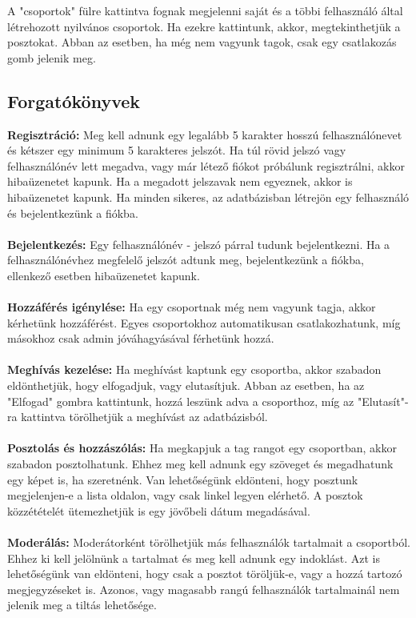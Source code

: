 \documentclass[
]{thesis-ekf}
\theoremstyle{definition}
\theoremstyle{remark}
\begin{document}
A "csoportok" fülre kattintva fognak megjelenni saját és a többi felhasználó által létrehozott nyilvános csoportok. Ha ezekre kattintunk, akkor, megtekinthetjük a posztokat. Abban az esetben, ha még nem vagyunk tagok, csak egy csatlakozás gomb jelenik meg.

\newpage 
\subsection{Forgatókönyvek}
\vspace{5mm}
\textbf{Regisztráció:} Meg kell adnunk egy legalább 5 karakter hosszú felhasználónevet és kétszer egy minimum 5 karakteres jelszót. Ha túl rövid jelszó vagy felhasználónév lett megadva, vagy már létező fiókot próbálunk regisztrálni, akkor hibaüzenetet kapunk. Ha a megadott jelszavak nem egyeznek, akkor is hibaüzenetet kapunk. Ha minden sikeres, az adatbázisban létrejön egy felhasználó és bejelentkezünk a fiókba. \\\\
\textbf{Bejelentkezés:} Egy felhasználónév - jelszó párral tudunk bejelentkezni. Ha a felhasználónévhez megfelelő jelszót adtunk meg, bejelentkezünk a fiókba, ellenkező esetben hibaüzenetet kapunk. \\\\
\textbf{Hozzáférés igénylése:} Ha egy csoportnak még nem vagyunk tagja, akkor kérhetünk hozzáférést. Egyes csoportokhoz automatikusan csatlakozhatunk, míg másokhoz csak admin jóváhagyásával férhetünk hozzá. \\\\
\textbf{Meghívás kezelése:} Ha meghívást kaptunk egy csoportba, akkor szabadon eldönthetjük, hogy elfogadjuk, vagy elutasítjuk. Abban az esetben, ha az "Elfogad" gombra kattintunk, hozzá leszünk adva a csoporthoz, míg az "Elutasít"-ra kattintva törölhetjük a meghívást az adatbázisból. \\\\
\textbf{Posztolás és hozzászólás:} Ha megkapjuk a tag rangot egy csoportban, akkor szabadon posztolhatunk. Ehhez meg kell adnunk egy szöveget és megadhatunk egy képet is, ha szeretnénk. Van lehetőségünk eldönteni, hogy posztunk megjelenjen-e a lista oldalon, vagy csak linkel legyen elérhető. A posztok közzétételét ütemezhetjük is egy jövőbeli dátum megadásával.\\\\
\textbf{Moderálás:} Moderátorként törölhetjük más felhasználók tartalmait a csoportból. Ehhez ki kell jelölnünk a tartalmat és meg kell adnunk egy indoklást. Azt is lehetőségünk van eldönteni, hogy csak a posztot töröljük-e, vagy a hozzá tartozó megjegyzéseket is. Azonos, vagy magasabb rangú felhasználók tartalmainál nem jelenik meg a tiltás lehetősége. \\\\
\end{document}

